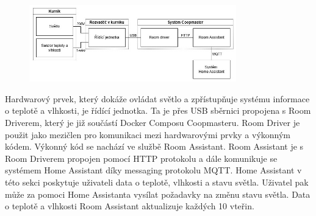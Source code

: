 \begin{figure}[h]
    \centering
    \includegraphics[width=0.8\textwidth]{img/svetlo_teplo_vlhkost}
    \label{fig:svetlo_teplo_vlhkost}
\end{figure}

Hardwarový prvek, který dokáže ovládat světlo a zpřístupňuje systému informace o teplotě a vlhkosti, je řídící jednotka.
Ta je přes USB sběrnici propojena s Room Driverem, který je již součástí Docker Composu Coopmasteru.
Room Driver je použit jako mezičlen pro komunikaci mezi hardwarovými prvky a výkonným kódem.
Výkonný kód se nachází ve službě Room Assistant.
Room Assistant je s Room Driverem propojen pomocí HTTP protokolu a dále komunikuje se systémem Home Assistant díky messaging protokolu MQTT.
Home Assistant v této sekci poskytuje uživateli data o teplotě, vlhkosti a stavu světla.
Uživatel pak může za pomoci Home Assistanta vysílat požadavky na změnu stavu světla.
Data o teplotě a vlhkosti Room Assistant aktualizuje každých 10 vteřin.



